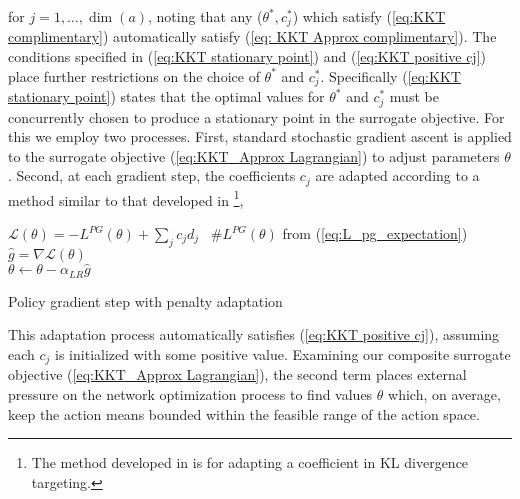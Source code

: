 \documentclass{UnderReview}
\DeclareMathOperator*{\E}{\mathbb{E}}
\begin{document}
for $j=1,\dots,\dim(a)$, noting that any ($\theta^*, c_j^*$) which satisfy (\ref{eq:KKT complimentary}) automatically satisfy (\ref{eq: KKT Approx complimentary}).  The conditions specified in (\ref{eq:KKT stationary point}) and (\ref{eq:KKT positive cj}) place further restrictions on the choice of $\theta^*$ and $c_j^*$.  Specifically (\ref{eq:KKT stationary point}) states that the optimal values for $\theta^*$ and $c_j^*$ must be concurrently chosen to produce a stationary point in the surrogate objective.  For this we employ two processes.  First, standard stochastic gradient ascent is applied to the surrogate objective (\ref{eq:KKT_Approx Lagrangian}) to adjust parameters $\theta$.  Second, at each gradient step, the coefficients $c_j$ are adapted according to a method similar to that developed in \cite{schulman2017proximal}\footnote{The method developed in \cite{schulman2017proximal} is for adapting a coefficient in KL divergence targeting.},   
\begin{algorithm}[] %
	\SetAlgoLined
	\For{j = 1,2,...,$\dim(a)$}{
		$d_j = \hat\E_{h}\left[ \max\left(\left|\mu_{j,\theta}(s_h)\right|-1, 0\right)^2 \right]$ \\
		\If{$d_j < d_{tar} / \alpha$}{$c_j \leftarrow c_j / \beta$}
		\If{$d_j > d_{tar} * \alpha$}{$c_j \leftarrow c_j * \beta$}
	}
	{$\mathcal{L(\theta)} = -L^{PG}(\theta) + \sum_j c_j d_j$} ~\#$L^{PG}(\theta)$ from (\ref{eq:L_pg_expectation})\\
	{$\hat g = \nabla \mathcal{L}(\theta)$ }	\\
	{$\theta \leftarrow \theta - \alpha_{LR} \hat{g}$}
	\caption{Policy gradient step with penalty adaptation}\label{algorithm:cj_adaptation}
\end{algorithm}
This adaptation process automatically satisfies (\ref{eq:KKT positive cj}), assuming each $c_j$ is initialized with some positive value.  Examining our composite surrogate objective (\ref{eq:KKT_Approx Lagrangian}), the second term places external pressure on the network optimization process to find values $\theta$ which, on average, keep the action means bounded within the feasible range of the action space.
\end{document}
